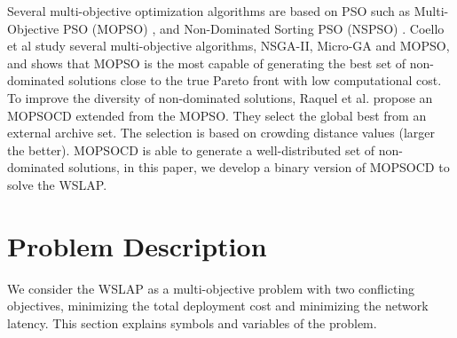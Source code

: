 \documentclass[10pt,journal,compsoc]{IEEEtran}
\begin{document}
Several multi-objective optimization algorithms are based on PSO such as Multi-Objective PSO (MOPSO) \cite{1304847}, and Non-Dominated Sorting PSO (NSPSO) \cite{NSPSO}. Coello et al \cite{1304847} study several multi-objective algorithms, NSGA-II, Micro-GA \cite{Micro} and MOPSO, and shows that MOPSO is the most capable of generating the best set of non-dominated solutions close to the true Pareto front with low computational cost. To improve the diversity of non-dominated solutions, Raquel et al. \cite{Raquel} propose an MOPSOCD extended from the MOPSO. They select the global best from an external archive set. The selection is based on crowding distance values (larger the better). MOPSOCD is able to generate a well-distributed set of non-dominated solutions, in this paper, we develop a binary version of MOPSOCD to solve the WSLAP.




\section{Problem Description} \label{sec:prelimminary}

We consider the WSLAP as a multi-objective problem with two conflicting objectives, minimizing the total deployment cost and minimizing the network latency. This section explains symbols and variables of the problem.
\end{document}
